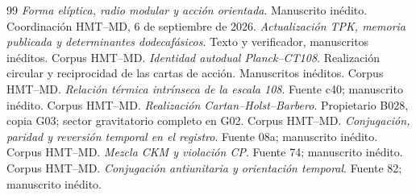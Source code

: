 \documentclass[11pt,a4paper]{article}
\numberwithin{equation}{section}
\theoremstyle{definition}
\begin{document}
\begin{thebibliography}{99}
\emph{Forma elíptica, radio modular y acción orientada}. Manuscrito inédito.
 Coordinación HMT--MD, 6 de septiembre de 2026.
\emph{Actualización TPK, memoria publicada y determinantes dodecafásicos}.
Texto y verificador, manuscritos inéditos.
 Corpus HMT--MD. \emph{Identidad autodual Planck--CT108}.
Realización circular y reciprocidad de las cartas de acción. Manuscritos inéditos.
 Corpus HMT--MD. \emph{Relación térmica intrínseca de la escala 108}.
Fuente c40; manuscrito inédito.
 Corpus HMT--MD. \emph{Realización Cartan--Holst--Barbero}.
Propietario B028, copia G03; sector gravitatorio completo en G02.
 Corpus HMT--MD. \emph{Conjugación, paridad y reversión temporal en el registro}.
Fuente 08a; manuscrito inédito.
 Corpus HMT--MD. \emph{Mezcla CKM y violación CP}.
Fuente 74; manuscrito inédito.
 Corpus HMT--MD. \emph{Conjugación antiunitaria y orientación temporal}.
Fuente 82; manuscrito inédito.
\end{thebibliography}
\end{document}
